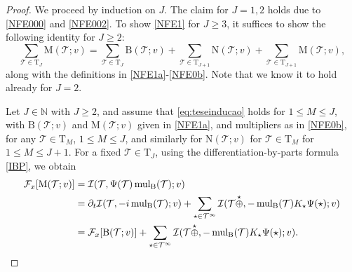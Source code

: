 \documentclass[%
11pt,  reqno]{amsart}
\makeatletter
\newcommand{\5}{\textup{V}}
\newcommand{\dt}{\partial_t}
\theoremstyle{remark}
\newcommand{\TT}{\mathcal{T}}
\newcommand{\Tr}{\mathrm{T}}
\newcommand{\Ft}{{\mathcal{F}}}
\newcommand{\N}{\mathbb{N}}
\DeclareMathOperator{\mulB}{mul_{\BB}}
\def\<#1>{\csname MH@symb@#1\endcsname}
\newcommand{\Ical}{\mathcal{I}}
\numberwithin{equation}{section}
\numberwithin{theorem}{section}
\newcommand{\MM}{\mathrm{M}}
\newcommand{\NN}{\mathrm{N}}
\newcommand{\BB}{\mathrm{B}}
\makeatother
\begin{document}
\begin{proof}



We proceed by induction on $J$. 
The claim for $J=1,2$ holds due to \eqref{NFE000} and \eqref{NFE002}.
To show \eqref{NFE1} for $J\ge3$, it suffices to show the following identity for $J\ge 2$:
\begin{equation}\label{eq:teseinducao}
\sum_{\TT\in\Tr_{J}} \MM(\TT; v) 
= 
\sum_{\TT\in \Tr_{J}} \BB(\TT; v) 
+
\sum_{\TT\in \Tr_{J+1}} \NN(\TT; v) 
+ \sum_{\TT\in \Tr_{J+1}} \MM(\TT; v),
\end{equation}
along with the definitions in \eqref{NFE1a}-\eqref{NFE0b}. Note that we know it to hold already for $J=2$. 


Let $J\in \N$ with $J\ge2$, and assume that \eqref{eq:teseinducao} holds for $1\le M \le J$, 
with $\BB(\TT; v)$ and $\MM(\TT; v)$ given in \eqref{NFE1a}, and multipliers as in \eqref{NFE0b}, for any $\TT\in \Tr_M$, $1\le M \le J$, and similarly for $\NN(\TT; v)$ for $\TT\in \Tr_M$ for $1\le M \le J+1$.
For a fixed $\TT\in\Tr_{J}$, using the differentiation-by-parts formula \eqref{IBP}, we obtain
\begin{align*}
\Ft_x [\MM(\TT; v) ]
&
=\Ical(\TT, \Psi(\TT)\mulB(\TT); v)
\\
& =
\dt\Ical(\TT, -i \mulB(\TT); v) +
\sum_{\star\in\TT^\infty}
\Ical (\TT \overset{\star}{\oplus} \<1>, -\mulB(\TT) K_\star \Psi(\star) ; v )
\\
&
= \Ft_x[\BB(\TT; v) ]  
+
\sum_{\star\in\TT^\infty} \Ical (\TT \overset{\star}{\oplus} \<1>, -\mulB(\TT) K_\star \Psi(\star) ; v).
\end{align*}




\end{proof}
\end{document}
